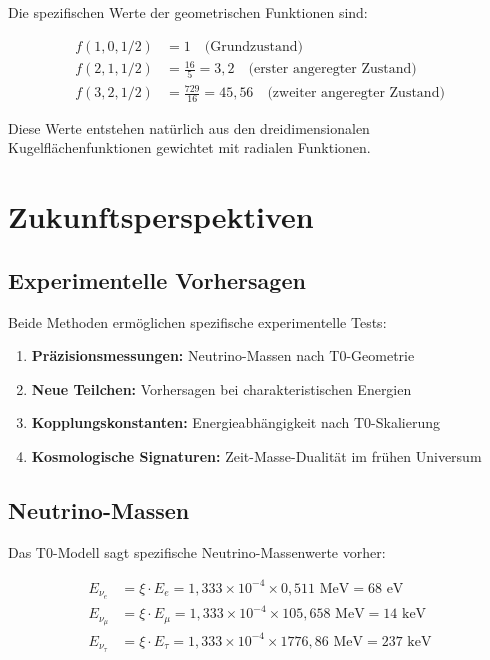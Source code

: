 \documentclass[12pt,a4paper]{article}
\begin{document}
	Die spezifischen Werte der geometrischen Funktionen sind:
	
	\begin{align}
		f(1,0,1/2) &= 1 \quad \text{(Grundzustand)} \\
		f(2,1,1/2) &= \frac{16}{5} = 3,2 \quad \text{(erster angeregter Zustand)} \\
		f(3,2,1/2) &= \frac{729}{16} = 45,56 \quad \text{(zweiter angeregter Zustand)}
	\end{align}
	
	Diese Werte entstehen natürlich aus den dreidimensionalen Kugelflächenfunktionen gewichtet mit radialen Funktionen.
	
	\section{Zukunftsperspektiven}
	\label{sec:future_perspectives}
	
	\subsection{Experimentelle Vorhersagen}
	\label{subsec:experimental_predictions}
	
	Beide Methoden ermöglichen spezifische experimentelle Tests:
	
	\begin{enumerate}
		\item \textbf{Präzisionsmessungen:} Neutrino-Massen nach T0-Geometrie
		\item \textbf{Neue Teilchen:} Vorhersagen bei charakteristischen Energien
		\item \textbf{Kopplungskonstanten:} Energieabhängigkeit nach T0-Skalierung
		\item \textbf{Kosmologische Signaturen:} Zeit-Masse-Dualität im frühen Universum
	\end{enumerate}
	
	\subsection{Neutrino-Massen}
	\label{subsec:neutrino_masses}
	
	Das T0-Modell sagt spezifische Neutrino-Massenwerte vorher:
	
	\begin{align}
		E_{\nu_e} &= \xi \cdot E_e = 1,333 \times 10^{-4} \times 0,511 \text{ MeV} = 68 \text{ eV} \\
		E_{\nu_\mu} &= \xi \cdot E_\mu = 1,333 \times 10^{-4} \times 105,658 \text{ MeV} = 14 \text{ keV} \\
		E_{\nu_\tau} &= \xi \cdot E_\tau = 1,333 \times 10^{-4} \times 1776,86 \text{ MeV} = 237 \text{ keV}
	\end{align}
	
\end{document}
